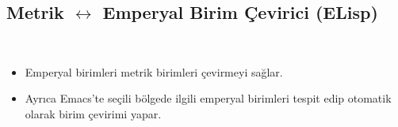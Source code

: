 \documentclass[a4paper, 9pt]{extarticle}
\begin{document}
\subsection{Metrik $\longleftrightarrow$ Emperyal Birim Çevirici (ELisp)}
\hfill \\
\begin{itemize}
\item Emperyal birimleri metrik birimleri çevirmeyi sağlar.
\item Ayrıca Emacs'te seçili bölgede ilgili emperyal birimleri tespit edip
	otomatik olarak birim çevirimi yapar.
\end{itemize}

\mydiller{}
\myteknikbecerilerb{}
\myhobilerb{}

\end{document}
